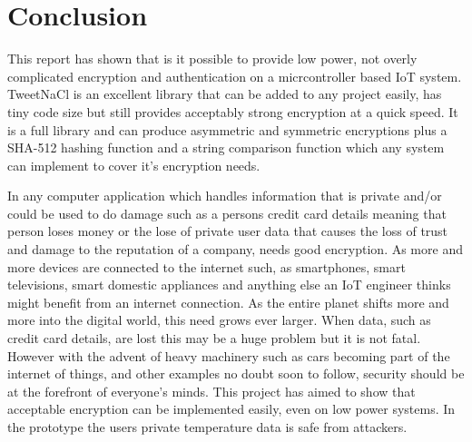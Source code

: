 


\chapter{Conclusion}
\label{conc}

This report has shown that is it possible to provide low power, not overly complicated encryption and authentication on a micrcontroller based IoT system. TweetNaCl is an excellent library that can be added to any project easily, has tiny code size but still provides acceptably strong encryption at a quick speed. It is a full library and can produce asymmetric and symmetric encryptions plus a SHA-512 hashing function and a string comparison function which any system can implement to cover it's encryption needs.

In any computer application which handles information that is private and/or could be used to do damage such as a persons credit card details meaning that person loses money or the lose of private user data that causes the loss of trust and damage to the reputation of a company, needs good encryption. As more and more devices are connected to the internet such, as smartphones, smart televisions, smart domestic appliances and anything else an IoT engineer thinks might benefit from an internet connection. As the entire planet shifts more and more into the digital world, this need grows ever larger. When data, such as credit card details, are lost this may be a huge problem but it is not fatal. However with the advent of heavy machinery such as cars becoming part of the internet of things, and other examples no doubt soon to follow, security should be at the forefront of everyone's minds. This project has aimed to show that acceptable encryption can be implemented easily, even on low power systems. In the prototype the users private temperature data is safe from attackers. 

